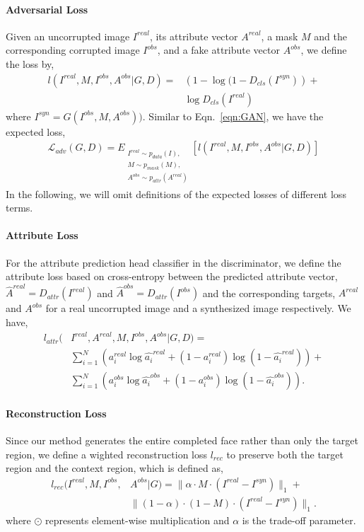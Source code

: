 \documentclass[acmtog,timestamp]{acmart}
\begin{document}
\paragraph{Adversarial Loss} Given an uncorrupted image $I^{real}$, its attribute vector $A^{real}$, a mask $M$ and the corresponding corrupted image $I^{obs}$, and a fake attribute vector $A^{obs}$, 
we define the loss by, 
\begin{align}
\nonumber l(I^{real}, M, I^{obs}, A^{obs} |G, D) =  &(1-\log{(1-D_{cls}(I^{syn})})+\\
& \log{D_{cls}(I^{real})} 
\end{align}
where $I^{syn}=G(I^{obs}, M, A^{obs}))$.
Similar to Eqn.~\ref{eqn:GAN}, we have the expected loss, 
\begin{align}
\mathcal{L}_{adv}(G,D) =  E_{\substack{I^{real}\sim p_{data}(I),\\ M\sim p_{mask}(M),\\A^{obs}\sim p_{attr}(A^{real})}}[l(I^{real}, M, I^{obs}, A^{obs} |G, D)]\label{eqn:expectedAdv}
\end{align}
In the following, we will omit definitions of the expected losses of different loss terms. 

\paragraph{Attribute Loss} For the attribute prediction head classifier in the discriminator, we define the attribute loss based on cross-entropy between the predicted attribute vector, $\hat{A}^{real}=D_{attr}(I^{real})$ and $\hat{A}^{obs}=D_{attr}(I^{obs})$ and the corresponding targets, $A^{real}$ and $A^{obs}$ for a real uncorrupted image and a synthesized image respectively. We have,
\begin{align}
\nonumber l_{attr}(&I^{real}, A^{real}, M, I^{obs}, A^{obs} |G, D)=\\
\nonumber &\sum_{i=1}^N (a_i^{real}\log \hat{a_i}^{real}+(1-a_i^{real})\log (1-\hat{a_i}^{real}))+\\
&\sum_{i=1}^N (a_i^{obs}\log \hat{a_i}^{obs}+(1-a_i^{obs})\log (1-\hat{a_i}^{obs})).\label{eqn:attr}
\end{align}\paragraph{Reconstruction Loss}
Since our method generates the entire completed face rather than only the target region, we define a wighted reconstruction loss $l_{rec}$ to preserve both the target region and the context region, which is defined as, 
\begin{align}
\nonumber l_{rec}(I^{real}, M,  I^{obs}, & A^{obs}|G) = \|\alpha \cdot M \cdot (I^{real}-I^{syn}) \|_1+\\
&\|(1-\alpha) \cdot (1-M) \cdot (I^{real}-I^{syn}) \|_1. \label{eqn:rec}
\end{align}
where $\odot$ represents element-wise multiplication and $\alpha$ is the trade-off parameter.
\end{document}
